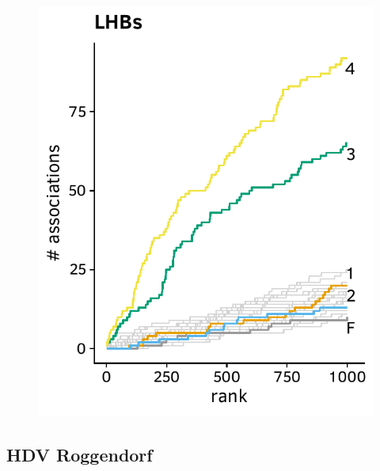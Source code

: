 \documentclass[a4paper,11pt]{article}
\begin{document}
\begin{figure}[H]
    \begin{minipage}{.49\textwidth}
      \includegraphics[width=\linewidth]{plots/comparison_plots/hbv_duesseldorf/LHBs_new_map.pdf}
    \end{minipage}
    \begin{minipage}{.49\textwidth}
    \end{minipage}
\end{figure}

\FloatBarrier
\subsection*{HDV Roggendorf}
\end{document}
